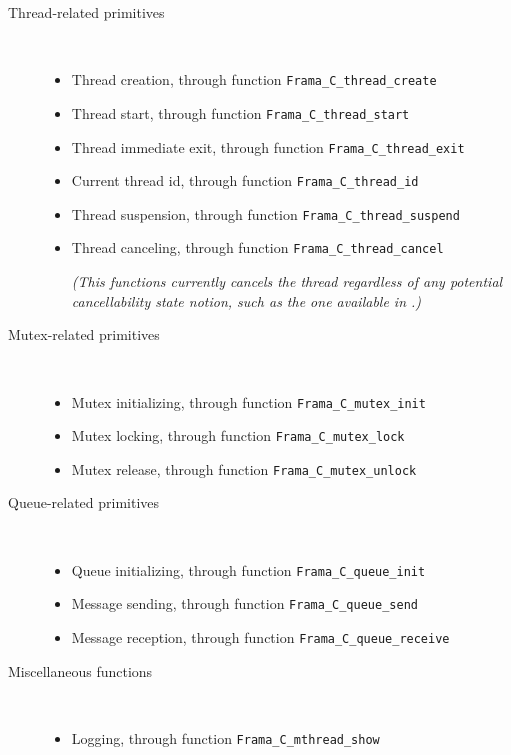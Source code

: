 \documentclass{frama-c-book}
\newcommand{\pthreads}{\library{pthreads}}
\begin{document}
\begin{description}
\item[Thread-related primitives] \

  \begin{itemize}
  \item Thread creation, through function \verb+Frama_C_thread_create+
  \item Thread start, through function \verb+Frama_C_thread_start+
  \item Thread immediate exit, through function \verb+Frama_C_thread_exit+
  \item Current thread id, through function \verb+Frama_C_thread_id+
  \item Thread suspension, through function \verb+Frama_C_thread_suspend+
  \item Thread canceling, through function \verb+Frama_C_thread_cancel+

    \it (This functions currently cancels the thread regardless of any
    potential cancellability state notion, such as the one available in
    \pthreads.)
  \end{itemize}


\item[Mutex-related primitives] \

  \begin{itemize}
  \item Mutex initializing, through function \verb+Frama_C_mutex_init+
  \item Mutex locking, through function \verb+Frama_C_mutex_lock+
  \item Mutex release, through function \verb+Frama_C_mutex_unlock+
  \end{itemize}

\item[Queue-related primitives] \

  \begin{itemize}
  \item Queue initializing, through function \verb+Frama_C_queue_init+
  \item Message sending, through function \verb+Frama_C_queue_send+
  \item Message reception, through function \verb+Frama_C_queue_receive+
  \end{itemize}

\item[Miscellaneous functions] \

  \begin{itemize}
  \item Logging, through function \verb+Frama_C_mthread_show+


\end{itemize}
\end{description}
\end{document}
